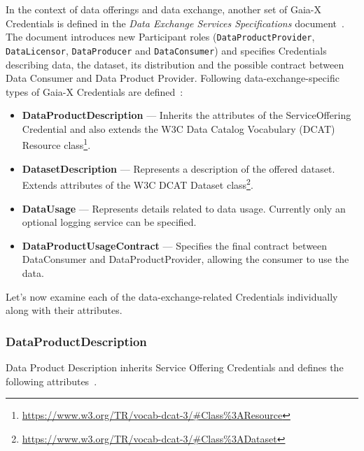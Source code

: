 In the context of data offerings and data exchange, another set of Gaia-X Credentials is defined in the \textit{Data Exchange Services Specifications} document~\cite{gaiax_data_exchange_document}.
The document introduces new Participant roles (\texttt{DataProductProvider}, \texttt{DataLicensor}, \texttt{DataProducer} and \texttt{DataConsumer}) and specifies Credentials describing data, the dataset, its distribution and the possible contract between Data Consumer and Data Product Provider.
Following data-exchange-specific types of Gaia-X Credentials are defined~\cite{gaiax_data_exchange_document}:
\begin{itemize}
    \item \textbf{DataProductDescription} --- Inherits the attributes of the ServiceOffering Credential and also extends the W3C Data Catalog Vocabulary (DCAT) Resource class\footnote{\url{https://www.w3.org/TR/vocab-dcat-3/\#Class\%3AResource}}.
    \item \textbf{DatasetDescription} --- Represents a description of the offered dataset.
    Extends attributes of the W3C DCAT Dataset class\footnote{\url{https://www.w3.org/TR/vocab-dcat-3/\#Class\%3ADataset}}.
    \item \textbf{DataUsage} --- Represents details related to data usage.
    Currently only an optional logging service can be specified.
    \item \textbf{DataProductUsageContract} --- Specifies the final contract between DataConsumer and DataProductProvider, allowing the consumer to use the data.
\end{itemize}

Let's now examine each of the data-exchange-related Credentials individually along with their attributes.

\subsubsection{DataProductDescription}

Data Product Description inherits Service Offering Credentials and defines the following attributes~\cite{gaiax_data_exchange_document}.

